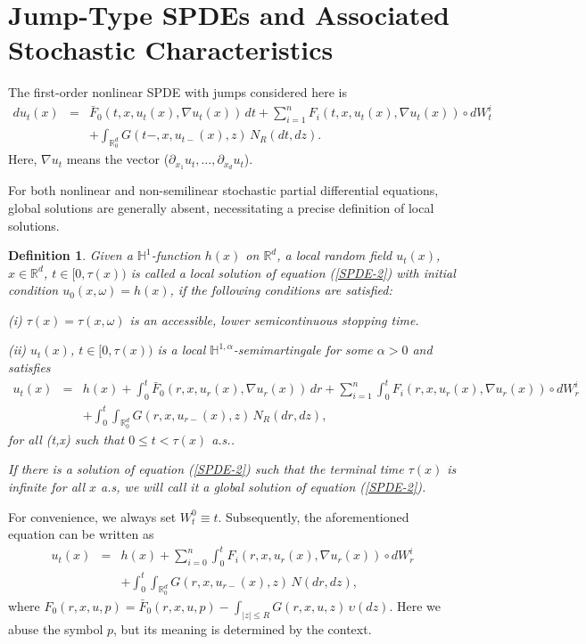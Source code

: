 \documentclass[12pt,oneside, reqno]{amsart}
\newcommand{\be}{\begin{eqnarray}}
\newcommand{\ee}{\end{eqnarray}}
\newcommand{\ce}{\begin{eqnarray*}}
\newcommand{\de}{\end{eqnarray*}}
\newtheorem{definition}[theorem]{Definition}
\def\no{\nonumber}
\def\mH{{\mathbb H}}
\def\mR{{\mathbb R}}
\def\leq{\leqslant}
\numberwithin{equation}{section}
\begin{document}
	\section{Jump-Type SPDEs and Associated Stochastic Characteristics}

The first-order nonlinear SPDE with jumps considered here is
\be\label{SPDE-2}
du_t(x)
&=&\bar{F}_0(t,x,u_t(x),\nabla u_t(x))\,dt+\sum_{i=1}^{n} F_i(t,x,u_t(x),\nabla u_t(x))\circ dW_t^i\no\\
&&+\int_{\mR^d_0} G(t-,x,u_{t-}(x),z)\, N_R(dt,dz).
\ee 
Here, $\nabla u_t$ means the vector ($\partial_{x_1}u_t,\ldots,\partial_{x_d}u_t $). 


 For both nonlinear and non-semilinear stochastic partial differential equations, global solutions are generally absent, necessitating a precise definition of local solutions.
 
 \begin{definition}
 	Given a $\mH^{1}$-function $h(x)$ on $\mR^d$, a local random field $u_t(x)$, $x\in\mR^d$, $t\in [0,\tau(x))$ is called a local solution of equation (\ref{SPDE-2}) with initial condition $u_0(x,\omega)=h(x)$, if the following conditions are satisfied:
 	
 	(i) $\tau(x)=\tau(x,\omega)$ is an accessible, lower semicontinuous stopping time.
 	
 	(ii) $u_t(x)$, $t\in [0,\tau(x))$ is a local $\mH^{1,\alpha}$-semimartingale for some $\alpha>0$ and satisfies 
 	\ce 
 	u_t(x)
 	&=&h(x)+\int_0^t \bar{F}_0(r,x,u_r(x),\nabla u_r(x))\,dr+\sum_{i=1}^{n}\int_0^t F_i(r,x,u_r(x),\nabla u_r(x))\circ dW_r^i\no\\
 	&&+\int_0^t\int_{\mR^d_0} G(r,x,u_{r-}(x),z)\, N_R(dr,dz),
 	\de 
 	for all (t,x) such that $0\leq t<\tau(x)$ a.s..
 	
 	If there is a solution of equation (\ref{SPDE-2}) such that the terminal time $\tau(x)$ is infinite for all $x$ a.s, we will call it a global solution of equation (\ref{SPDE-2}).
 \end{definition}

For convenience, we always set $W_t^0\equiv t$. Subsequently, the aforementioned equation can be written as 
\be\label{SPDE-30}
u_t(x)&=&h(x)+\sum_{i=0}^{n}\int_0^t F_i(r,x,u_r(x),\nabla u_r(x))\circ dW_r^i\no\\
&&+\int_0^t\int_{\mR^d_0} G(r,x,u_{r-}(x),z) \,N(dr,dz),
\ee  
where $ F_0(r,x,u,p)=\bar{F}_0(r,x,u,p)-\int_{|z|\leq R}G(r,x,u,z)\,\upsilon(dz)$. Here we abuse the symbol 
$p$, but its meaning is determined by the context.
\end{document}

